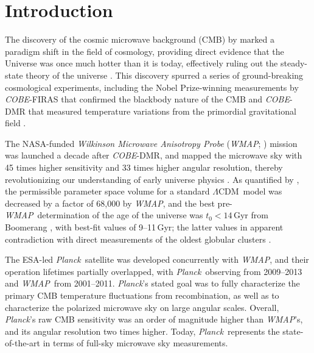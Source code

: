 \documentclass[twocolumn]{../../common/aa}
\def\WMAP{\emph{WMAP}}
\def\COBE{\emph{COBE}}
\def\Planck{\emph{Planck}}
\def\LCDM{$\Lambda$CDM}
\begin{document}

\maketitle

\tableofcontents



\section{Introduction}
\label{sec:introduction}

The discovery of the cosmic microwave background (CMB) by \citet{penzias:1965} marked a paradigm shift in the field of cosmology, providing direct evidence that the Universe was once much hotter than it is today, effectively ruling out the steady-state theory of the universe \citep{dicke:1965}. This discovery spurred a series of ground-breaking cosmological experiments, including the Nobel Prize-winning measurements by \COBE-FIRAS that confirmed the blackbody nature of the CMB \citep{mather:1994} and \COBE-DMR that measured temperature variations from the primordial gravitational field \citep{smoot:1992}.

The NASA-funded \textit{Wilkinson Microwave Anisotropy Probe} (\WMAP; \citealp{bennett2003:MAP}) mission was launched a decade after \COBE-DMR, and mapped the microwave sky with 45 times higher sensitivity and 33 times higher angular resolution, thereby revolutionizing our understanding of early universe physics \citep{bennett2003:MAP}. As quantified by \citet{bennett2012}, the permissible parameter space volume for a standard \LCDM\ model was decreased by a factor of 68,000 by \WMAP, and the best pre-\WMAP\ determination of the age of the universe was $t_0<14\,\mathrm{Gyr}$ from Boomerang \citep{lange:2001}, with best-fit values of 9--11\,Gyr; the latter values in apparent contradiction with direct measurements of the oldest globular clusters \citep{hu:2001}.

The ESA-led \Planck\ satellite \citep{planck2016-l01} was developed concurrently with \WMAP, and their operation lifetimes partially overlapped, with \Planck\ observing from 2009--2013 and \WMAP\ from 2001--2011. \Planck's stated goal was to fully characterize the primary CMB temperature fluctuations from recombination, as well as to characterize the polarized microwave sky on large angular scales.  Overall, \Planck's raw CMB sensitivity was an order of magnitude higher than \WMAP's, and its angular resolution two times higher. Today, \Planck\ represents the state-of-the-art in terms of full-sky microwave sky measurements.
\end{document}
